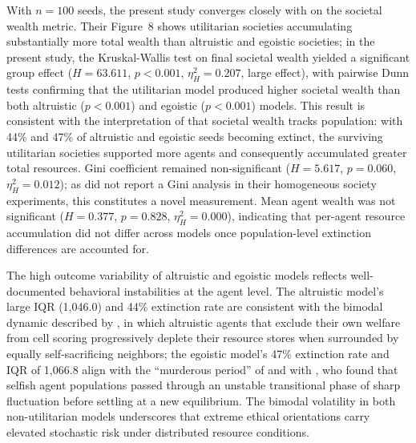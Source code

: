 \documentclass{icsthesis}
\begin{document}
\begin{mainmatter}
With $n = 100$ seeds, the present study converges closely with \citet{KremerHerman2024} on the societal wealth metric. Their Figure~8 shows utilitarian societies accumulating substantially more total wealth than altruistic and egoistic societies; in the present study, the Kruskal-Wallis test on final societal wealth yielded a significant group effect ($H = 63.611$, $p < 0.001$, $\eta^2_H = 0.207$, large effect), with pairwise Dunn tests confirming that the utilitarian model produced higher societal wealth than both altruistic ($p < 0.001$) and egoistic ($p < 0.001$) models. This result is consistent with the interpretation of \citet{KremerHerman2024} that societal wealth tracks population: with 44\% and 47\% of altruistic and egoistic seeds becoming extinct, the surviving utilitarian societies supported more agents and consequently accumulated greater total resources. Gini coefficient remained non-significant ($H = 5.617$, $p = 0.060$, $\eta^2_H = 0.012$); as \citet{KremerHerman2024} did not report a Gini analysis in their homogeneous society experiments, this constitutes a novel measurement. Mean agent wealth was not significant ($H = 0.377$, $p = 0.828$, $\eta^2_H = 0.000$), indicating that per-agent resource accumulation did not differ across models once population-level extinction differences are accounted for.

The high outcome variability of altruistic and egoistic models reflects well-documented behavioral instabilities at the agent level. The altruistic model's large IQR (1,046.0) and 44\% extinction rate are consistent with the bimodal dynamic described by \citet{KremerHerman2024}, in which altruistic agents that exclude their own welfare from cell scoring progressively deplete their resource stores when surrounded by equally self-sacrificing neighbors; the egoistic model's 47\% extinction rate and IQR of 1,066.8 align with the ``murderous period'' of \citet{KremerHerman2024} and with \citet{Xiang2008}, who found that selfish agent populations passed through an unstable transitional phase of sharp fluctuation before settling at a new equilibrium. The bimodal volatility in both non-utilitarian models underscores that extreme ethical orientations carry elevated stochastic risk under distributed resource conditions.


\end{mainmatter}
\end{document}

